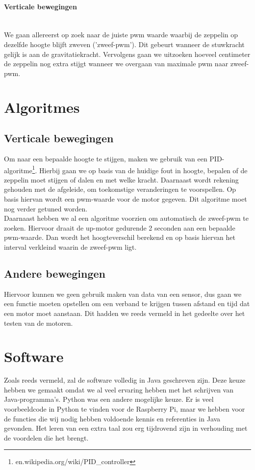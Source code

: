 \documentclass[eind]{penoverslag}
\begin{document}
\paragraph{Verticale bewegingen} ~\\ 
We gaan allereerst op zoek naar de juiste pwm waarde waarbij de zeppelin op dezelfde hoogte blijft zweven ('zweef-pwm').  Dit gebeurt wanneer de stuwkracht gelijk is aan de gravitatiekracht.  Vervolgens gaan we uitzoeken hoeveel centimeter de zeppelin nog extra stijgt wanneer we overgaan van maximale pwm naar zweef-pwm.\\



\section{Algoritmes}
\subsection{Verticale bewegingen}
Om naar een bepaalde hoogte te stijgen, maken we gebruik van een PID-algoritme\footnote{en.wikipedia.org/wiki/PID\_controller}. Hierbij gaan we op basis van de huidige fout in hoogte, bepalen of de zeppelin moet stijgen of dalen en met welke kracht. Daarnaast wordt rekening gehouden met de afgeleide, om toekomstige veranderingen te voorspellen. Op basis hiervan wordt een pwm-waarde voor de motor gegeven. Dit algoritme moet nog verder getuned worden. \\

Daarnaast hebben we al een algoritme voorzien om automatisch de zweef-pwm te zoeken. Hiervoor draait de up-motor gedurende 2 seconden aan een bepaalde pwm-waarde. Dan wordt het hoogteverschil berekend en op basis hiervan het interval verkleind waarin de zweef-pwm ligt. \\

\subsection{Andere bewegingen}
Hiervoor kunnen we geen gebruik maken van data van een sensor, dus gaan we een functie moeten opstellen om een verband te krijgen tussen afstand en tijd dat een motor moet aanstaan. Dit hadden we reeds vermeld in het gedeelte over het testen van de motoren. \\

\section{Software}
Zoals reeds vermeld, zal de software volledig in Java geschreven zijn. Deze keuze hebben we gemaakt omdat we al veel ervaring hebben met het schrijven van Java-programma's. Python was een andere mogelijke keuze. Er is veel voorbeeldcode in Python te vinden voor de Raspberry Pi, maar we hebben voor de functies die wij nodig hebben voldoende kennis en referenties in Java gevonden. Het leren van een extra taal zou erg tijdrovend zijn in verhouding met de voordelen die het brengt. \\
\end{document}
